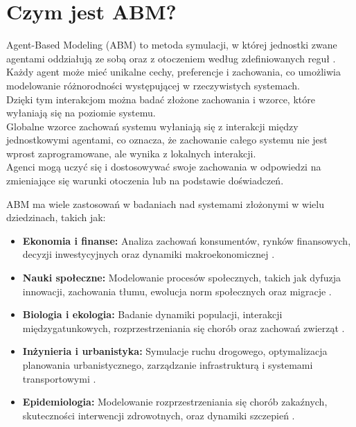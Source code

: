 \section{Czym jest ABM?}
Agent-Based Modeling (ABM) to metoda symulacji, w której jednostki zwane agentami oddziałują ze sobą oraz z otoczeniem według zdefiniowanych reguł \cite{Macal2010}.
\\ Każdy agent może mieć unikalne cechy, preferencje i zachowania, co umożliwia modelowanie różnorodności występującej w rzeczywistych systemach.
\\ Dzięki tym interakcjom można badać złożone zachowania i wzorce, które wyłaniają się na poziomie systemu.
\\ Globalne wzorce zachowań systemu wyłaniają się z interakcji między jednostkowymi agentami, co oznacza, że zachowanie całego systemu nie jest wprost zaprogramowane, ale wynika z lokalnych interakcji.
\\ Agenci mogą uczyć się i dostosowywać swoje zachowania w odpowiedzi na zmieniające się warunki otoczenia lub na podstawie doświadczeń.

ABM ma wiele zastosowań w badaniach nad systemami złożonymi w wielu dziedzinach, takich jak:

\begin{itemize}
    \item \textbf{Ekonomia i finanse:} Analiza zachowań konsumentów, rynków finansowych, decyzji inwestycyjnych oraz dynamiki makroekonomicznej \cite{Tesfatsion2006}.
    \item \textbf{Nauki społeczne:} Modelowanie procesów społecznych, takich jak dyfuzja innowacji, zachowania tłumu, ewolucja norm społecznych oraz migracje \cite{Epstein2007}.
    \item \textbf{Biologia i ekologia:} Badanie dynamiki populacji, interakcji międzygatunkowych, rozprzestrzeniania się chorób oraz zachowań zwierząt \cite{Grimm2005}.
    \item \textbf{Inżynieria i urbanistyka:} Symulacje ruchu drogowego, optymalizacja planowania urbanistycznego, zarządzanie infrastrukturą i systemami transportowymi \cite{Bonabeau2002}.
    \item \textbf{Epidemiologia:} Modelowanie rozprzestrzeniania się chorób zakaźnych, skuteczności interwencji zdrowotnych, oraz dynamiki szczepień \cite{Eubank2004}.
\end{itemize}
